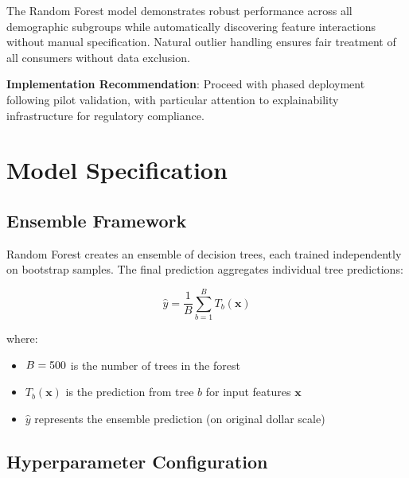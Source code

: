 The Random Forest model demonstrates robust performance across all demographic subgroups while automatically discovering feature interactions without manual specification. Natural outlier handling ensures fair treatment of all consumers without data exclusion.

\textbf{Implementation Recommendation}: Proceed with phased deployment following pilot validation, with particular attention to explainability infrastructure for regulatory compliance.

\section{Model Specification}

\subsection{Ensemble Framework}

Random Forest creates an ensemble of \ModelNineNTrees{} decision trees, each trained independently on bootstrap samples. The final prediction aggregates individual tree predictions:

\begin{equation}
\hat{y} = \frac{1}{B} \sum_{b=1}^{B} T_b(\mathbf{x})
\end{equation}

where:
\begin{itemize}
    \item $B = 500{}$ is the number of trees in the forest
    \item $T_b(\mathbf{x})$ is the prediction from tree $b$ for input features $\mathbf{x}$
    \item $\hat{y}$ represents the ensemble prediction (on original dollar scale)
\end{itemize}

\subsection{Hyperparameter Configuration}

